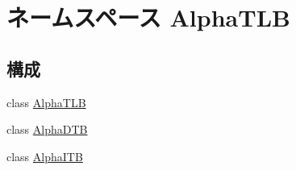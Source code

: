 \hypertarget{namespaceAlphaTLB}{
\section{ネームスペース AlphaTLB}
\label{namespaceAlphaTLB}
}
\subsection*{構成}
\begin{DoxyCompactItemize}
\item 
class \hyperlink{classAlphaTLB_1_1AlphaTLB}{AlphaTLB}
\item 
class \hyperlink{classAlphaTLB_1_1AlphaDTB}{AlphaDTB}
\item 
class \hyperlink{classAlphaTLB_1_1AlphaITB}{AlphaITB}
\end{DoxyCompactItemize}

